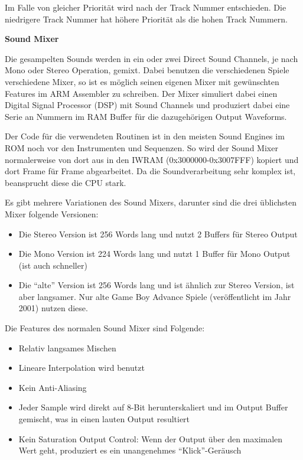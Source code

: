 \documentclass[11pt,a4paper]{scrartcl}
\newcommand{\paratitle}[1] {
    \vspace{5mm}
    \large \textbf{#1} \normalsize
    \vspace{2mm}\newline
}
\begin{document}
Im Falle von gleicher Priorit\"at wird nach der Track Nummer entschieden. Die niedrigere Track Nummer hat h\"ohere Priorit\"at als die hohen Track Nummern.

\newpage
\paratitle{Sound Mixer}
Die gesampelten Sounds werden in ein oder zwei Direct Sound Channels, je nach Mono oder Stereo Operation, gemixt. Dabei benutzen die verschiedenen Spiele verschiedene Mixer, so ist es m\"oglich seinen eigenen Mixer mit gew\"unschten Features im ARM Assembler zu schreiben. Der Mixer simuliert dabei einen Digital Signal Processor (DSP) mit Sound Channels und produziert dabei eine Serie an Nummern im RAM Buffer f\"ur die dazugeh\"origen Output Waveforms.

Der Code f\"ur die verwendeten Routinen ist in den meisten Sound Engines im ROM noch vor den Instrumenten und Sequenzen. So wird der Sound Mixer normalerweise von dort aus in den IWRAM (0x3000000-0x3007FFF) kopiert und dort Frame f\"ur Frame abgearbeitet. Da die Soundverarbeitung sehr komplex ist, beansprucht diese die CPU stark. 

Es gibt mehrere Variationen des Sound Mixers, darunter sind die drei \"ublichsten Mixer folgende Versionen:

\begin{itemize}
    \item Die Stereo Version ist 256 Words lang und nutzt 2 Buffers f\"ur Stereo Output
    \item Die Mono Version ist 224 Words lang und nutzt 1 Buffer f\"ur Mono Output (ist auch schneller)
    \item Die \enquote{alte} Version ist 256 Words lang und ist \"ahnlich zur Stereo Version, ist aber langsamer. Nur alte Game Boy Advance Spiele (ver\"offentlicht im Jahr 2001) nutzen diese.
\end{itemize}

Die Features des normalen Sound Mixer sind Folgende:
\begin{itemize}
    \item Relativ langsames Mischen
    \item Lineare Interpolation wird benutzt
    \item Kein Anti-Aliasing
    \item Jeder Sample wird direkt auf 8-Bit herunterskaliert und im Output Buffer gemischt, was in einen lauten Output resultiert
    \item Kein Saturation Output Control: Wenn der Output \"uber den maximalen Wert geht, produziert es ein unangenehmes \enquote{Klick}-Ger\"ausch
\end{itemize}
\end{document}
